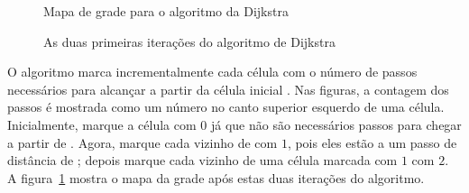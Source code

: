 \begin{figure}
\begin{minipage}{.5\textwidth}
\caption{Mapa de grade para o algoritmo da Dijkstra}
\label{fig.dijkstra-simple}
\end{minipage}
\hspace{\fill}
\begin{minipage}{.5\textwidth}
\caption{As duas primeiras iterações do algoritmo de Dijkstra}
\label{fig.dijkstra-simple-2}
\end{minipage}
\end{figure}


O algoritmo marca incrementalmente cada célula  com o número de passos necessários para alcançar  a partir da célula inicial . Nas figuras, a contagem dos passos é mostrada como um número no canto superior esquerdo de uma célula. Inicialmente, marque a célula  com $0$ já que não são necessários passos para chegar  a partir de . Agora, marque cada vizinho de  com $1$, pois eles estão a um passo de distância de ; depois marque cada vizinho de uma célula marcada com $1$ com $2$. A figura~\ref{fig.dijkstra-simple-2} mostra o mapa da grade após estas duas iterações do algoritmo.

